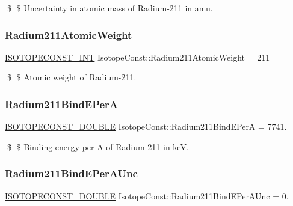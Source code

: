 \$ \$ Uncertainty in atomic mass of Radium-\/211 in amu. \mbox{\label{group___isotope_const-_radium-_ra211_gaf69ad2edf26f86c77a3a8443d9a23602}} 
\subsubsection{\texorpdfstring{Radium211\+Atomic\+Weight}{Radium211AtomicWeight}}
{\footnotesize\ttfamily \mbox{\hyperlink{group___isotope_const-_macros_ga5f18360b3e99483a35c32d789e62621c}{I\+S\+O\+T\+O\+P\+E\+C\+O\+N\+S\+T\+\_\+\+I\+NT}} Isotope\+Const\+::\+Radium211\+Atomic\+Weight = 211}

\$ \$ Atomic weight of Radium-\/211. \mbox{\label{group___isotope_const-_radium-_ra211_ga740674cd444d1b201491eac49686b840}} 
\subsubsection{\texorpdfstring{Radium211\+Bind\+E\+PerA}{Radium211BindEPerA}}
{\footnotesize\ttfamily \mbox{\hyperlink{group___isotope_const-_macros_ga8f45a7272ce02c0b4c65c44636ed719a}{I\+S\+O\+T\+O\+P\+E\+C\+O\+N\+S\+T\+\_\+\+D\+O\+U\+B\+LE}} Isotope\+Const\+::\+Radium211\+Bind\+E\+PerA = 7741.}

\$ \$ Binding energy per A of Radium-\/211 in keV. \mbox{\label{group___isotope_const-_radium-_ra211_ga73b6bc905a723acc2d67cc13a0b02622}} 
\subsubsection{\texorpdfstring{Radium211\+Bind\+E\+Per\+A\+Unc}{Radium211BindEPerAUnc}}
{\footnotesize\ttfamily \mbox{\hyperlink{group___isotope_const-_macros_ga8f45a7272ce02c0b4c65c44636ed719a}{I\+S\+O\+T\+O\+P\+E\+C\+O\+N\+S\+T\+\_\+\+D\+O\+U\+B\+LE}} Isotope\+Const\+::\+Radium211\+Bind\+E\+Per\+A\+Unc = 0.}

